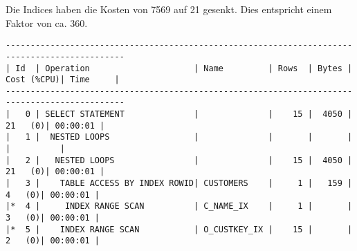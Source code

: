 \documentclass[11pt,a4paper,parskip=half]{scrartcl}
\begin{document}
Die Indices haben die Kosten von 7569 auf 21 gesenkt. Dies entspricht einem Faktor von ca. 360.
\begin{lstlisting}
----------------------------------------------------------------------------------------------                                                                                                                                                                                                               
| Id  | Operation                     | Name         | Rows  | Bytes | Cost (%CPU)| Time     |                                                                                                                                                                                                               
----------------------------------------------------------------------------------------------                                                                                                                                                                                                               
|   0 | SELECT STATEMENT              |              |    15 |  4050 |    21   (0)| 00:00:01 |                                                                                                                                                                                                               
|   1 |  NESTED LOOPS                 |              |       |       |            |          |                                                                                                                                                                                                               
|   2 |   NESTED LOOPS                |              |    15 |  4050 |    21   (0)| 00:00:01 |                                                                                                                                                                                                               
|   3 |    TABLE ACCESS BY INDEX ROWID| CUSTOMERS    |     1 |   159 |     4   (0)| 00:00:01 |                                                                                                                                                                                                               
|*  4 |     INDEX RANGE SCAN          | C_NAME_IX    |     1 |       |     3   (0)| 00:00:01 |                                                                                                                                                                                                               
|*  5 |    INDEX RANGE SCAN           | O_CUSTKEY_IX |    15 |       |     2   (0)| 00:00:01 |                                                                                                                                                                                                               

\end{lstlisting}
\end{document}
